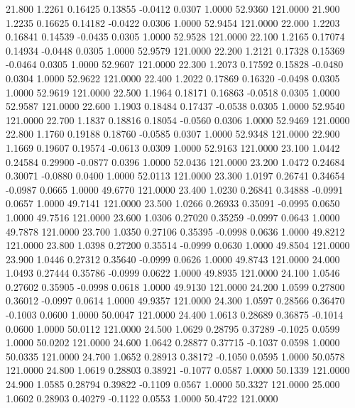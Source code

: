   21.800   1.2261   0.16425   0.13855  -0.0412   0.0307   1.0000  52.9360 121.0000
  21.900   1.2235   0.16625   0.14182  -0.0422   0.0306   1.0000  52.9454 121.0000
  22.000   1.2203   0.16841   0.14539  -0.0435   0.0305   1.0000  52.9528 121.0000
  22.100   1.2165   0.17074   0.14934  -0.0448   0.0305   1.0000  52.9579 121.0000
  22.200   1.2121   0.17328   0.15369  -0.0464   0.0305   1.0000  52.9607 121.0000
  22.300   1.2073   0.17592   0.15828  -0.0480   0.0304   1.0000  52.9622 121.0000
  22.400   1.2022   0.17869   0.16320  -0.0498   0.0305   1.0000  52.9619 121.0000
  22.500   1.1964   0.18171   0.16863  -0.0518   0.0305   1.0000  52.9587 121.0000
  22.600   1.1903   0.18484   0.17437  -0.0538   0.0305   1.0000  52.9540 121.0000
  22.700   1.1837   0.18816   0.18054  -0.0560   0.0306   1.0000  52.9469 121.0000
  22.800   1.1760   0.19188   0.18760  -0.0585   0.0307   1.0000  52.9348 121.0000
  22.900   1.1669   0.19607   0.19574  -0.0613   0.0309   1.0000  52.9163 121.0000
  23.100   1.0442   0.24584   0.29900  -0.0877   0.0396   1.0000  52.0436 121.0000
  23.200   1.0472   0.24684   0.30071  -0.0880   0.0400   1.0000  52.0113 121.0000
  23.300   1.0197   0.26741   0.34654  -0.0987   0.0665   1.0000  49.6770 121.0000
  23.400   1.0230   0.26841   0.34888  -0.0991   0.0657   1.0000  49.7141 121.0000
  23.500   1.0266   0.26933   0.35091  -0.0995   0.0650   1.0000  49.7516 121.0000
  23.600   1.0306   0.27020   0.35259  -0.0997   0.0643   1.0000  49.7878 121.0000
  23.700   1.0350   0.27106   0.35395  -0.0998   0.0636   1.0000  49.8212 121.0000
  23.800   1.0398   0.27200   0.35514  -0.0999   0.0630   1.0000  49.8504 121.0000
  23.900   1.0446   0.27312   0.35640  -0.0999   0.0626   1.0000  49.8743 121.0000
  24.000   1.0493   0.27444   0.35786  -0.0999   0.0622   1.0000  49.8935 121.0000
  24.100   1.0546   0.27602   0.35905  -0.0998   0.0618   1.0000  49.9130 121.0000
  24.200   1.0599   0.27800   0.36012  -0.0997   0.0614   1.0000  49.9357 121.0000
  24.300   1.0597   0.28566   0.36470  -0.1003   0.0600   1.0000  50.0047 121.0000
  24.400   1.0613   0.28689   0.36875  -0.1014   0.0600   1.0000  50.0112 121.0000
  24.500   1.0629   0.28795   0.37289  -0.1025   0.0599   1.0000  50.0202 121.0000
  24.600   1.0642   0.28877   0.37715  -0.1037   0.0598   1.0000  50.0335 121.0000
  24.700   1.0652   0.28913   0.38172  -0.1050   0.0595   1.0000  50.0578 121.0000
  24.800   1.0619   0.28803   0.38921  -0.1077   0.0587   1.0000  50.1339 121.0000
  24.900   1.0585   0.28794   0.39822  -0.1109   0.0567   1.0000  50.3327 121.0000
  25.000   1.0602   0.28903   0.40279  -0.1122   0.0553   1.0000  50.4722 121.0000
